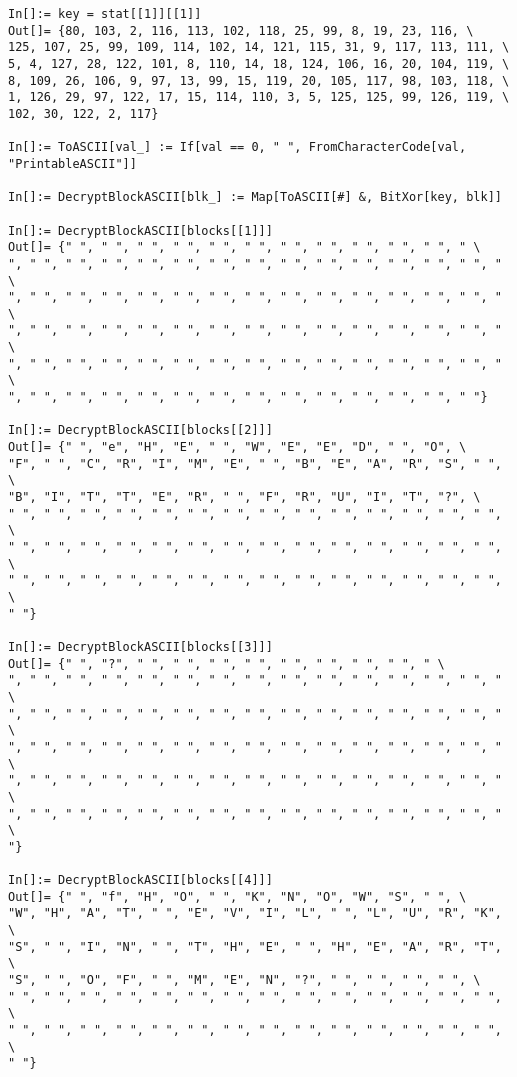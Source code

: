 \begin{lstlisting}[style=custommath]
In[]:= key = stat[[1]][[1]]
Out[]= {80, 103, 2, 116, 113, 102, 118, 25, 99, 8, 19, 23, 116, \
125, 107, 25, 99, 109, 114, 102, 14, 121, 115, 31, 9, 117, 113, 111, \
5, 4, 127, 28, 122, 101, 8, 110, 14, 18, 124, 106, 16, 20, 104, 119, \
8, 109, 26, 106, 9, 97, 13, 99, 15, 119, 20, 105, 117, 98, 103, 118, \
1, 126, 29, 97, 122, 17, 15, 114, 110, 3, 5, 125, 125, 99, 126, 119, \
102, 30, 122, 2, 117}

In[]:= ToASCII[val_] := If[val == 0, " ", FromCharacterCode[val, "PrintableASCII"]]

In[]:= DecryptBlockASCII[blk_] := Map[ToASCII[#] &, BitXor[key, blk]]

In[]:= DecryptBlockASCII[blocks[[1]]]
Out[]= {" ", " ", " ", " ", " ", " ", " ", " ", " ", " ", " ", " \
", " ", " ", " ", " ", " ", " ", " ", " ", " ", " ", " ", " ", " ", " \
", " ", " ", " ", " ", " ", " ", " ", " ", " ", " ", " ", " ", " ", " \
", " ", " ", " ", " ", " ", " ", " ", " ", " ", " ", " ", " ", " ", " \
", " ", " ", " ", " ", " ", " ", " ", " ", " ", " ", " ", " ", " ", " \
", " ", " ", " ", " ", " ", " ", " ", " ", " ", " ", " ", " ", " "}

In[]:= DecryptBlockASCII[blocks[[2]]]
Out[]= {" ", "e", "H", "E", " ", "W", "E", "E", "D", " ", "O", \
"F", " ", "C", "R", "I", "M", "E", " ", "B", "E", "A", "R", "S", " ", \
"B", "I", "T", "T", "E", "R", " ", "F", "R", "U", "I", "T", "?", \
" ", " ", " ", " ", " ", " ", " ", " ", " ", " ", " ", " ", " ", " ", \
" ", " ", " ", " ", " ", " ", " ", " ", " ", " ", " ", " ", " ", " ", \
" ", " ", " ", " ", " ", " ", " ", " ", " ", " ", " ", " ", " ", " ", \
" "}

In[]:= DecryptBlockASCII[blocks[[3]]]
Out[]= {" ", "?", " ", " ", " ", " ", " ", " ", " ", " ", " \
", " ", " ", " ", " ", " ", " ", " ", " ", " ", " ", " ", " ", " ", " \
", " ", " ", " ", " ", " ", " ", " ", " ", " ", " ", " ", " ", " ", " \
", " ", " ", " ", " ", " ", " ", " ", " ", " ", " ", " ", " ", " ", " \
", " ", " ", " ", " ", " ", " ", " ", " ", " ", " ", " ", " ", " ", " \
", " ", " ", " ", " ", " ", " ", " ", " ", " ", " ", " ", " ", " ", " \
"}

In[]:= DecryptBlockASCII[blocks[[4]]]
Out[]= {" ", "f", "H", "O", " ", "K", "N", "O", "W", "S", " ", \
"W", "H", "A", "T", " ", "E", "V", "I", "L", " ", "L", "U", "R", "K", \
"S", " ", "I", "N", " ", "T", "H", "E", " ", "H", "E", "A", "R", "T", \
"S", " ", "O", "F", " ", "M", "E", "N", "?", " ", " ", " ", " ", \
" ", " ", " ", " ", " ", " ", " ", " ", " ", " ", " ", " ", " ", " ", \
" ", " ", " ", " ", " ", " ", " ", " ", " ", " ", " ", " ", " ", " ", \
" "}
\end{lstlisting}

